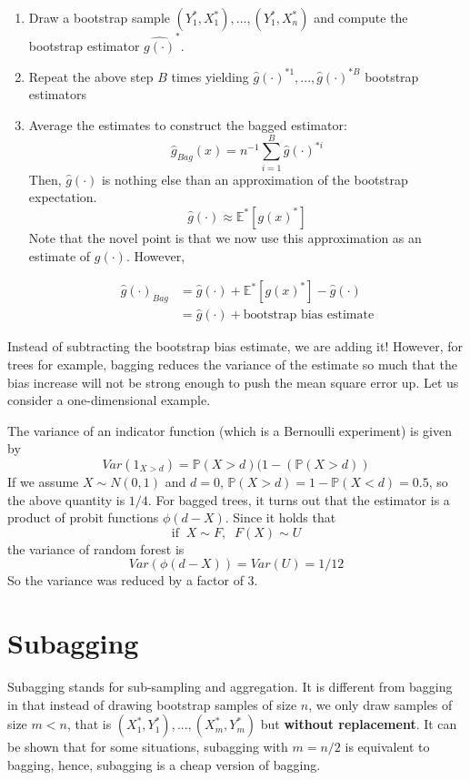 \documentclass[]{book}
\providecommand{\tightlist}{%
  \setlength{\itemsep}{0pt}\setlength{\parskip}{0pt}}
\begin{document}
\begin{enumerate}
\def\labelenumi{\arabic{enumi}.}
\tightlist
\item
  Draw a bootstrap sample \((Y_1^*, X_1^*), ..., (Y_1^*, X_n^*)\) and
  compute the bootstrap estimator \(\hat{g(\cdot)}^*\).
\item
  Repeat the above step \(B\) times yielding
  \(\hat{g}(\cdot)^{*1}, ..., \hat{g}(\cdot)^{*B}\) bootstrap estimators
\item
  Average the estimates to construct the bagged estimator:
  \[ \hat{g}_{Bag}(x) = n^{-1} \sum\limits_{i = 1}^B\hat{g}(\cdot)^{*i}\]
  Then, \(\hat{g}(\cdot)\) is nothing else than an approximation of the
  bootstrap expectation.
  \[\hat{g}(\cdot) \approx \mathbb{E}^*[g(x)^{*}]\] Note that the novel
  point is that we now use this approximation as an estimate of
  \(g(\cdot)\). However,

  \begin{equation}
     \begin{split}
     \hat{g}(\cdot)_{Bag} & = \hat{g}(\cdot) + \mathbb{E}^*[g(x)^{*}] - \hat{g}(\cdot) \\
     & = \hat{g}(\cdot) + \text{bootstrap bias estimate}
     \end{split}
     \end{equation}
\end{enumerate}

Instead of subtracting the bootstrap bias estimate, we are adding it!
However, for trees for example, bagging reduces the variance of the
estimate so much that the bias increase will not be strong enough to
push the mean square error up. Let us consider a one-dimensional
example.

The variance of an indicator function (which is a Bernoulli experiment)
is given by
\[ Var(1_{X>d}) = \mathbb{P}(X > d)(1 - (\mathbb{P}(X > d))\] If we
assume \(X \sim N(0, 1)\) and \(d = 0\),
\(\mathbb{P}(X > d) = 1 - \mathbb{P}(X<d) = 0.5\), so the above quantity
is \(1/4\). For bagged trees, it turns out that the estimator is a
product of probit functions \(\phi(d-X)\). Since it holds that
\[ \text{if}\;\; X \sim F, \;\;F(X) \sim U\] the variance of random
forest is \[Var(\phi(d-X)) = Var(U) = 1/12\] So the variance was reduced
by a factor of 3.

\section{Subagging}\label{subagging}

Subagging stands for sub-sampling and aggregation. It is different from
bagging in that instead of drawing bootstrap samples of size \(n\), we
only draw samples of size \(m < n\), that is
\((X_1^*, Y_1^*), ..., (X_m^*, Y_m^*)\) but \textbf{without
replacement}. It can be shown that for some situations, subagging with
\(m = n/2\) is equivalent to bagging, hence, subagging is a cheap
version of bagging.
\end{document}
